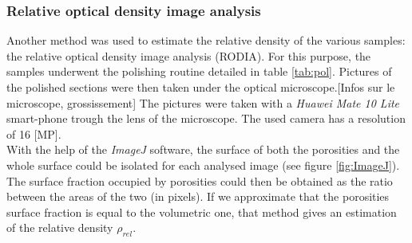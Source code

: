 \subsubsection{Relative optical density image analysis}

Another method was used to estimate the relative density of the various samples: the relative optical density image analysis (RODIA). For this purpose, the samples underwent the polishing routine detailed in table \ref{tab:pol}. Pictures of the polished sections were then taken under the optical microscope.[Infos sur le microscope, grossissement] The pictures were taken with a \textit{Huawei Mate 10 Lite} smart-phone trough the lens of the microscope. The used camera has a resolution of 16 [MP]. \\

With the help of the \textit{ImageJ} software, the surface of both the porosities and the whole surface could be isolated for each analysed image (see figure \ref{fig:ImageJ}). The surface fraction occupied by porosities could then be obtained as the ratio between the areas of the two (in pixels). If we approximate that the porosities surface fraction is equal to the volumetric one, that method gives an estimation of the relative density $\rho_{rel}$.


 \begin{center}
\begin{table}[ht]
\noindent{}
\label{tab:pol}
\caption[Polishing routine for Al-Si alloys]{Polishing routine for Al-Si alloys}
\end{table}
 \end{center}


